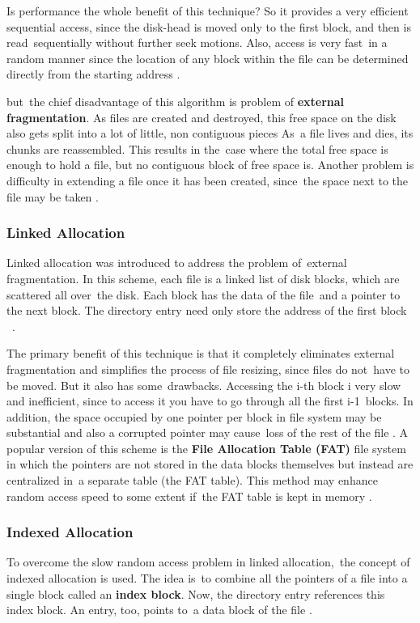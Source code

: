\documentclass[12pt]{article}
\begin{document}
Is performance the whole benefit of this technique? So it provides a very efficient sequential access, since the disk-head is moved only to the first block, and then is read sequentially without further seek motions. Also, access is very fast in a random manner since the location of any block within the file can be determined directly from the starting address \parencite{Fiveable2025}.

but the chief disadvantage of this algorithm is problem of \textbf{external fragmentation}. As files are created and destroyed, this free space on the disk also gets split into a lot of little, non contiguous pieces As a file lives and dies, its chunks are reassembled. This results in the case where the total free space is enough to hold a file, but no contiguous block of free space is. Another problem is difficulty in extending a file once it has been created, since the space next to the file may be taken \parencite{Silberschatz2018}.

\subsubsection{Linked Allocation}
Linked allocation was introduced to address the problem of external fragmentation. In this scheme, each file is a linked list of disk blocks, which are scattered all over the disk. Each block has the data of the file and a pointer to the next block. The directory entry need only store the address of the first block \parencite{Silberschatz2018} .

The primary benefit of this technique is that it completely eliminates external fragmentation and simplifies the process of file resizing, since files do not have to be moved. But it also has some drawbacks. Accessing the i-th block i very slow and inefficient, since to access it you have to go through all the first i-1 blocks. In addition, the space occupied by one pointer per block in file system may be substantial and also a corrupted pointer may cause loss of the rest of the file \parencite{Tanenbaum2014}. A popular version of this scheme is the \textbf{File Allocation Table (FAT)} file system in which the pointers are not stored in the data blocks themselves but instead are centralized in a separate table (the FAT table). This method may enhance random access speed to some extent if the FAT table is kept in memory \parencite{Fiveable2025}. 

\subsubsection{Indexed Allocation}
To overcome the slow random access problem in linked allocation, the concept of indexed allocation is used. The idea is to combine all the pointers of a file into a single block called an \textbf{index block}. Now, the directory entry references this index block. An entry, too, points to a data block of the file \parencite{Silberschatz2018}.
\end{document}
